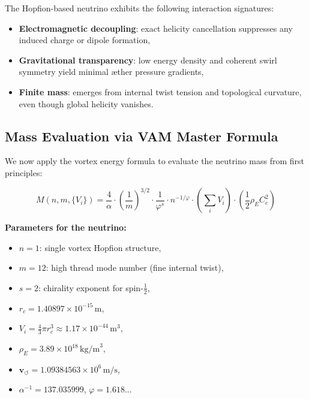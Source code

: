 \documentclass[preprint]{revtex4-2}
\begin{document}
The Hopfion-based neutrino exhibits the following interaction signatures:

\begin{itemize}
    \item \textbf{Electromagnetic decoupling}: exact helicity cancellation suppresses any induced charge or dipole formation,
    \item \textbf{Gravitational transparency}: low energy density and coherent swirl symmetry yield minimal æther pressure gradients,
    \item \textbf{Finite mass}: emerges from internal twist tension and topological curvature, even though global helicity vanishes.
\end{itemize}

\subsection{Mass Evaluation via VAM Master Formula}

We now apply the vortex energy formula to evaluate the neutrino mass from first principles:

\begin{equation}
\boxed{
M(n, m, \{V_i\}) = \frac{4}{\alpha} \cdot \left( \frac{1}{m} \right)^{3/2} \cdot \frac{1}{\varphi^s} \cdot n^{-1/\varphi} \cdot \left( \sum_i V_i \right) \cdot \left( \frac{1}{2} \rho_{\scriptscriptstyle\boldsymbol\!E}C_e^2 \right)
}
\end{equation}

\noindent
\textbf{Parameters for the neutrino:}
\begin{itemize}
    \item \(n = 1\): single vortex Hopfion structure,
    \item \(m = 12\): high thread mode number (fine internal twist),
    \item \(s = 2\): chirality exponent for spin-\(\frac{1}{2}\),
    \item \(r_c = 1.40897 \times 10^{-15} \, \text{m}\),
    \item \(V_i = \frac{4}{3} \pi r_c^3 \approx 1.17 \times 10^{-44} \, \text{m}^3\),
    \item \(\rho_{\scriptscriptstyle\boldsymbol\!E}= 3.89 \times 10^{18} \, \text{kg/m}^3\),
    \item \(\mathbf{v}_{\scriptscriptstyle\boldsymbol{\circlearrowleft}} = 1.09384563 \times 10^6 \, \text{m/s}\),
    \item \(\alpha^{-1} = 137.035999\), \quad \(\varphi = 1.618...\)
\end{itemize}
\end{document}
